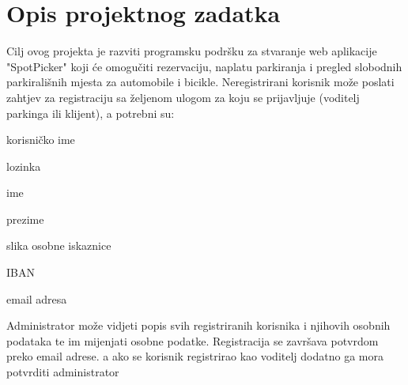 \chapter{Opis projektnog zadatka}


{Cilj ovog projekta je razviti programsku podršku za stvaranje web aplikacije "SpotPicker" koji će omogučiti rezervaciju, naplatu parkiranja i pregled slobodnih parkirališnih mjesta za automobile i bicikle. }
{Neregistrirani korisnik može poslati zahtjev za registraciju sa željenom ulogom za koju se prijavljuje (voditelj parkinga ili klijent), a potrebni su: }
\begin{packed_item}
	\item {korisničko ime}
	\item {lozinka}
	\item {ime}
	\item {prezime}
	\item {slika osobne iskaznice}
	\item {IBAN}
	\item {email adresa}
\end{packed_item}
Administrator može vidjeti popis svih registriranih korisnika i njihovih osobnih podataka te im mijenjati osobne podatke. Registracija se završava potvrdom preko email adrese. a ako se korisnik registrirao kao voditelj dodatno ga mora potvrditi administrator




\eject

